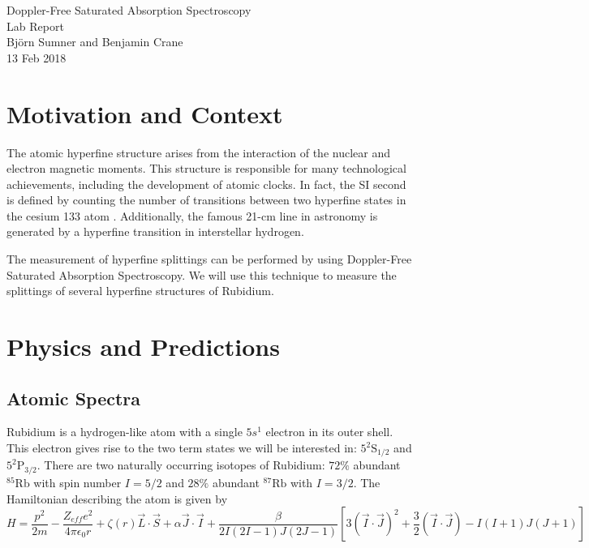 \documentclass[12pt]{article}
\begin{document}
\begin{center}
{\Large Doppler-Free Saturated Absorption Spectroscopy} \\
{\Large Lab Report} \\[.3in]
{\large Bj\"{o}rn Sumner and Benjamin Crane} \\
{13 Feb 2018}
\end{center}

\section*{Motivation and Context}

The atomic hyperfine structure arises from the interaction of the nuclear and electron magnetic moments.  This structure is responsible for many technological achievements, including the development of atomic clocks.  In fact, the SI second is defined by counting the number of transitions between two hyperfine states in the cesium 133 atom \cite{NISTsec}.  Additionally, the famous 21-cm line in astronomy is generated by a hyperfine transition in interstellar hydrogen\cite{21cmPred}.

The measurement of hyperfine splittings can be performed by using Doppler-Free Saturated Absorption Spectroscopy.  We will use this technique to measure the splittings of several hyperfine structures of Rubidium.

\section*{Physics and Predictions}

\subsection*{Atomic Spectra}
Rubidium is a hydrogen-like atom with a single $5s^1$ electron in its outer shell.  This electron gives rise to the two term states we will be interested in: $5^2\text{S}_{1/2}$ and $5^2\text{P}_{3/2}$.  There are two naturally occurring isotopes of Rubidium: $72\%$ abundant ${}^{85}\text{Rb}$ with spin number $I=5/2$ and $28\%$ abundant ${}^{87}\text{Rb}$ with $I = 3/2$.
The Hamiltonian describing the atom is given by
$$
H = \frac{p^2}{2m} - \frac{Z_{eff} e^2}{4 \pi \epsilon_0 r} + \zeta(r) \vec{L}\cdot \vec{S} + \alpha \vec{J}\cdot \vec{I} + \frac{\beta}{2I(2I-1)J(2J-1)}\left[3(\vec{I}\cdot \vec{J})^2 + \frac{3}{2}(\vec{I}\cdot \vec{J}) - I(I+1)J(J+1)\right]
$$
\end{document}
